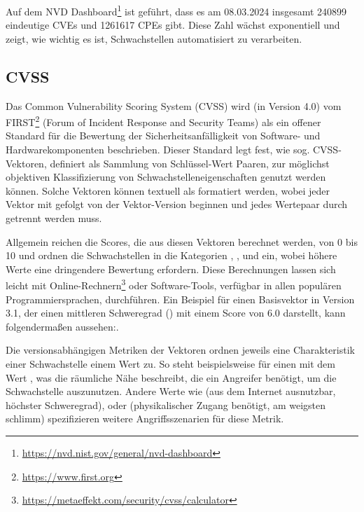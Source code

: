 \newline{}

Auf dem NVD Dashboard\footnote{\url{https://nvd.nist.gov/general/nvd-dashboard}} ist geführt, dass es am 08.03.2024 insgesamt 240899 eindeutige CVEs und 1261617 CPEs gibt.
Diese Zahl wächst exponentiell und zeigt, wie wichtig es ist, Schwachstellen automatisiert zu verarbeiten.

\subsection{CVSS} \label{subsec:projektbericht-grundlagen-cvss}

Das Common Vulnerability Scoring System (CVSS) wird (in Version 4.0) \cite{CVSSv4.0Specification} vom FIRST\footnote{\url{https://www.first.org}} (Forum of Incident Response and Security Teams) als ein offener Standard für die Bewertung der Sicherheitsanfälligkeit von Software- und Hardwarekomponenten beschrieben.
Dieser Standard legt fest, wie sog. CVSS-Vektoren, definiert als Sammlung von Schlüssel-Wert Paaren, zur möglichst objektiven Klassifizierung von Schwachstelleneigenschaften genutzt werden können.
Solche Vektoren können textuell als  formatiert werden, wobei jeder Vektor mit  gefolgt von der Vektor-Version beginnen und jedes Wertepaar durch \qt{/} getrennt werden muss.

Allgemein reichen die Scores, die aus diesen Vektoren berechnet werden, von 0 bis 10 und ordnen die Schwachstellen in die Kategorien , ,  und  ein, wobei höhere Werte eine dringendere Bewertung erfordern.
Diese Berechnungen lassen sich leicht mit Online-Rechnern\footnote{\url{https://metaeffekt.com/security/cvss/calculator}} oder Software-Tools, verfügbar in allen populären Programmiersprachen, durchführen.
Ein Beispiel für einen Basisvektor in Version 3.1, der einen mittleren Schweregrad () mit einem Score von 6.0 darstellt, kann folgendermaßen aussehen:\newline{}.

Die versionsabhängigen Metriken der Vektoren ordnen jeweils eine Charakteristik einer Schwachstelle einem Wert zu.
So steht beispielsweise  für einen  mit dem Wert , was die räumliche Nähe beschreibt, die ein Angreifer benötigt, um die Schwachstelle auszunutzen.
Andere Werte wie  (aus dem Internet ausnutzbar, höchster Schweregrad),  oder  (physikalischer Zugang benötigt, am weigsten schlimm) spezifizieren weitere Angriffsszenarien für diese Metrik.


